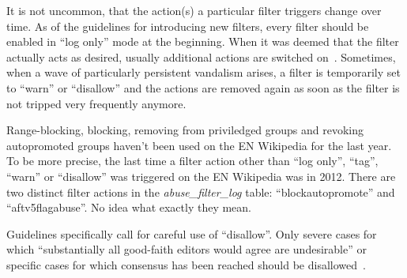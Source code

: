 It is not uncommon, that the action(s) a particular filter triggers change over time.
As of the guidelines for introducing new filters, every filter should be enabled in ``log only'' mode at the beginning.
When it was deemed that the filter actually acts as desired, usually additional actions are switched on~\cite{Wikipedia:EditFilterInstructions}.
Sometimes, when a wave of particularly persistent vandalism arises, a filter is temporarily set to ``warn'' or ``disallow'' and the actions are removed again as soon as the filter is not tripped very frequently anymore. %

Range-blocking, blocking, removing from priviledged groups and revoking autopromoted groups haven't been used on the EN Wikipedia for the last year. %
To be more precise, the last time a filter action other than ``log only'', ``tag'', ``warn'' or ``disallow'' was triggered on the EN Wikipedia was in 2012.
There are two distinct filter actions in the \emph{abuse\_filter\_log} table: ``blockautopromote'' and ``aftv5flagabuse''.
No idea what exactly they mean.

Guidelines specifically call for careful use of ``disallow''.
Only severe cases for which ``substantially all good-faith editors would agree are undesirable'' or specific cases for which consensus has been reached should be disallowed~\cite{Wikipedia:EditFilter}.


